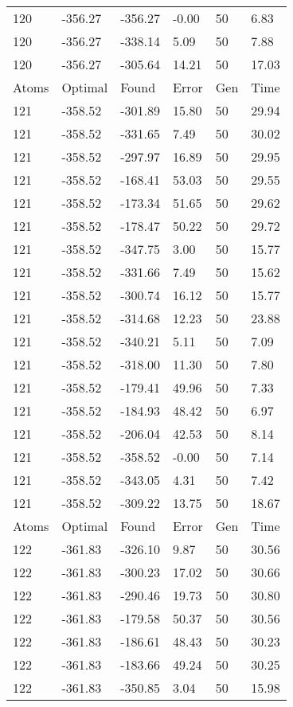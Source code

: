 \documentclass{report}
\begin{document}
\begin{appendix}
\begin{longtable}{llllll}
120 & -356.27 & -356.27 & -0.00 & 50 & 6.83 \\
120 & -356.27 & -338.14 & 5.09 & 50 & 7.88 \\
120 & -356.27 & -305.64 & 14.21 & 50 & 17.03 \\
Atoms & Optimal & Found & Error & Gen & Time \\
121 & -358.52 & -301.89 & 15.80 & 50 & 29.94 \\
121 & -358.52 & -331.65 & 7.49 & 50 & 30.02 \\
121 & -358.52 & -297.97 & 16.89 & 50 & 29.95 \\
121 & -358.52 & -168.41 & 53.03 & 50 & 29.55 \\
121 & -358.52 & -173.34 & 51.65 & 50 & 29.62 \\
121 & -358.52 & -178.47 & 50.22 & 50 & 29.72 \\
121 & -358.52 & -347.75 & 3.00 & 50 & 15.77 \\
121 & -358.52 & -331.66 & 7.49 & 50 & 15.62 \\
121 & -358.52 & -300.74 & 16.12 & 50 & 15.77 \\
121 & -358.52 & -314.68 & 12.23 & 50 & 23.88 \\
121 & -358.52 & -340.21 & 5.11 & 50 & 7.09 \\
121 & -358.52 & -318.00 & 11.30 & 50 & 7.80 \\
121 & -358.52 & -179.41 & 49.96 & 50 & 7.33 \\
121 & -358.52 & -184.93 & 48.42 & 50 & 6.97 \\
121 & -358.52 & -206.04 & 42.53 & 50 & 8.14 \\
121 & -358.52 & -358.52 & -0.00 & 50 & 7.14 \\
121 & -358.52 & -343.05 & 4.31 & 50 & 7.42 \\
121 & -358.52 & -309.22 & 13.75 & 50 & 18.67 \\
Atoms & Optimal & Found & Error & Gen & Time \\
122 & -361.83 & -326.10 & 9.87 & 50 & 30.56 \\
122 & -361.83 & -300.23 & 17.02 & 50 & 30.66 \\
122 & -361.83 & -290.46 & 19.73 & 50 & 30.80 \\
122 & -361.83 & -179.58 & 50.37 & 50 & 30.56 \\
122 & -361.83 & -186.61 & 48.43 & 50 & 30.23 \\
122 & -361.83 & -183.66 & 49.24 & 50 & 30.25 \\
122 & -361.83 & -350.85 & 3.04 & 50 & 15.98 \\

\end{longtable}
\end{appendix}
\end{document}
